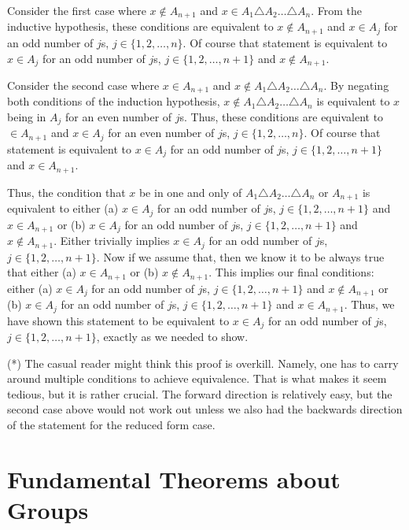 \documentclass[12pt]{article}
\numberwithin{theorem}{section}
\numberwithin{equation}{section}
\numberwithin{remark}{section}
\numberwithin{definition}{section}
\numberwithin{theorem}{section}
\numberwithin{lemma}{section}
\numberwithin{example}{section}
\begin{document}
Consider the first case where $x\notin A_{n+1}$ and $x\in A_1\triangle A_2\ldots \triangle A_n$. From the inductive hypothesis, these conditions are equivalent to $x\notin A_{n+1}$ and $x\in A_j$ for an odd number of $j$s, $j\in\{1,2,\ldots,n\}$. Of course that statement is equivalent to $x\in A_j$ for an odd number of $j$s, $j\in\{1,2,\ldots,n+1\}$ and $x\notin A_{n+1}$.

Consider the second case where $x\in A_{n+1}$ and $x\notin A_1\triangle A_2\ldots \triangle A_n$. By negating both conditions of the induction hypothesis, $x\notin A_1\triangle A_2\ldots \triangle A_n$ is equivalent to $x$ being in $A_j$ for an even number of $j$s. Thus, these conditions are equivalent to $\in A_{n+1}$ and $x\in A_j$ for an even number of $j$s, $j\in\{1,2,\ldots,n\}$. Of course that statement is equivalent to $x\in A_j$ for an odd number of $j$s, $j\in\{1,2,\ldots,n+1\}$ and $x\in A_{n+1}$.

Thus, the condition that $x$ be in one and only of $A_1\triangle A_2\ldots \triangle A_n$ or $A_{n+1}$ is equivalent to either (a) $x\in A_j$ for an odd number of $j$s, $j\in\{1,2,\ldots,n+1\}$ and $x\in A_{n+1}$ or (b) $x\in A_j$ for an odd number of $j$s, $j\in\{1,2,\ldots,n+1\}$ and $x\notin A_{n+1}$. Either trivially implies $x\in A_j$ for an odd number of $j$s, $j\in\{1,2,\ldots,n+1\}$. Now if we assume that, then we know it to be always true that either (a) $x\in A_{n+1}$ or (b) $x\notin A_{n+1}$. This implies our final conditions: either (a) $x\in A_j$ for an odd number of $j$s, $j\in\{1,2,\ldots,n+1\}$ and $x\notin A_{n+1}$ or (b) $x\in A_j$ for an odd number of $j$s, $j\in\{1,2,\ldots,n+1\}$ and $x\in A_{n+1}$. Thus, we have shown this statement to be equivalent to $x\in A_j$ for an odd number of $j$s, $j\in\{1,2,\ldots,n+1\}$, exactly as we needed to show.

\vspace{\baselineskip}

\noindent (*) The casual reader might think this proof is overkill. Namely, one has to carry around multiple conditions to achieve equivalence. That is what makes it seem tedious, but it is rather crucial. The forward direction is relatively easy, but the second case above would not work out unless we also had the backwards direction of the statement for the reduced form case. 



\newpage

\section{Fundamental Theorems about Groups}
\end{document}
